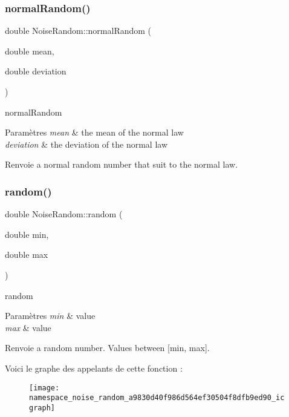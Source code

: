 \subsubsection{\texorpdfstring{normal\+Random()}{normalRandom()}}
{\footnotesize\ttfamily double Noise\+Random\+::normal\+Random (\begin{DoxyParamCaption}\item[{double}]{mean,  }\item[{double}]{deviation }\end{DoxyParamCaption})}



normal\+Random 


\begin{DoxyParams}{Paramètres}
{\em mean} & the mean of the normal law \\
\hline
{\em deviation} & the deviation of the normal law \\
\hline
\end{DoxyParams}
\begin{DoxyReturn}{Renvoie}
a normal random number that suit to the normal law. 
\end{DoxyReturn}
\mbox{\label{namespace_noise_random_a9830d40f986d564ef30504f8dfb9ed90}} 
\subsubsection{\texorpdfstring{random()}{random()}}
{\footnotesize\ttfamily double Noise\+Random\+::random (\begin{DoxyParamCaption}\item[{double}]{min,  }\item[{double}]{max }\end{DoxyParamCaption})}



random 


\begin{DoxyParams}{Paramètres}
{\em min} & value \\
\hline
{\em max} & value \\
\hline
\end{DoxyParams}
\begin{DoxyReturn}{Renvoie}
a random number. Values between \mbox{[}min, max\mbox{]}. 
\end{DoxyReturn}
Voici le graphe des appelants de cette fonction \+:\nopagebreak
\begin{figure}[H]
\begin{center}
\leavevmode
\texttt{[image: namespace\_noise\_random\_a9830d40f986d564ef30504f8dfb9ed90\_icgraph]}
\end{center}
\end{figure}

